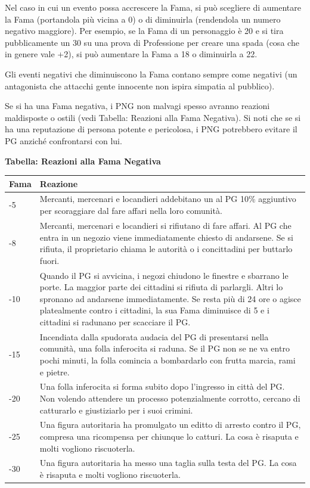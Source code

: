 \documentclass[a4paper,twoside,openany]{book}
\begin{document}
\begin{multicols}{2}
Nel caso in cui un evento possa accrescere la Fama, si può scegliere di aumentare la Fama (portandola più vicina a 0) o di diminuirla (rendendola un numero negativo maggiore). Per esempio, se la Fama di un personaggio è 20 e si tira pubblicamente un 30 su una prova di Professione per creare una spada (cosa che in genere vale +2), si può aumentare la Fama a 18 o diminuirla a 22.

Gli eventi negativi che diminuiscono la Fama contano sempre come negativi (un antagonista che attacchi gente innocente non ispira simpatia al pubblico).

Se si ha una Fama negativa, i PNG non malvagi spesso avranno reazioni maldisposte o ostili (vedi Tabella: Reazioni alla Fama Negativa). Si noti che se si ha una reputazione di persona potente e pericolosa, i PNG potrebbero evitare il PG anziché confrontarsi con lui.


\end{multicols}

\textbf{Tabella: Reazioni alla Fama Negativa}

\medskip

\begin{tabularx}{0.95\textwidth}{lX}
\textbf{Fama}&\textbf{Reazione}\\
\toprule
-5&Mercanti, mercenari e locandieri addebitano un al PG 10\% aggiuntivo per scoraggiare dal fare affari nella loro comunità.\\
-8&Mercanti, mercenari e locandieri si rifiutano di fare affari. Al PG che entra in un negozio viene immediatamente chiesto di andarsene. Se si rifiuta, il proprietario chiama le autorità o i concittadini per buttarlo fuori.\\
-10&Quando il PG si avvicina, i negozi chiudono le finestre e sbarrano le porte. La maggior parte dei cittadini si rifiuta di parlargli. Altri lo spronano ad andarsene immediatamente. Se resta più di 24 ore o agisce platealmente contro i cittadini, la sua Fama diminuisce di 5 e i cittadini si radunano per scacciare il PG.\\
-15&Incendiata dalla spudorata audacia del PG di presentarsi nella comunità, una folla inferocita si raduna. Se il PG non se ne va entro pochi minuti, la folla comincia a bombardarlo con frutta marcia, rami e pietre.\\
-20&Una folla inferocita si forma subito dopo l'ingresso in città del PG. Non volendo attendere un processo potenzialmente corrotto, cercano di catturarlo e giustiziarlo per i suoi crimini.\\
-25&Una figura autoritaria ha promulgato un editto di arresto contro il PG, compresa una ricompensa per chiunque lo catturi. La cosa è risaputa e molti vogliono riscuoterla.\\
-30&Una figura autoritaria ha messo una taglia sulla testa del PG. La cosa è risaputa e molti vogliono riscuoterla.\\

\end{tabularx}
\end{document}
